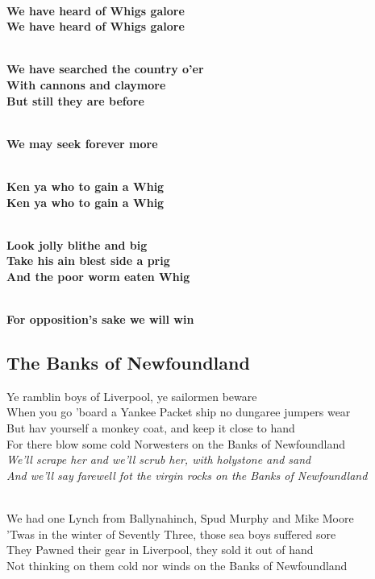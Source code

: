 \documentclass[letterpaper,12pt]{article}
\begin{document}
\begin{multicols}{2}
\noindent
\\\textbf{We have heard of Whigs galore}
\\\textbf{We have heard of Whigs galore}

\noindent
\\\textbf{We have searched the country o'er
\\With cannons and claymore
\\But still they are before}

\noindent
\\\textbf{We may seek forever more}

\noindent
\\\textbf{Ken ya who to gain a Whig}
\\\textbf{Ken ya who to gain a Whig}

\noindent
\\\textbf{Look jolly blithe and big
\\Take his ain blest side a prig
\\And the poor worm eaten Whig}

\noindent
\\\textbf{For opposition's sake we will win}
\end{multicols}
\newpage

\subsection{The Banks of Newfoundland}

\noindent
Ye ramblin boys of Liverpool, ye sailormen beware
\\When you go 'board a Yankee Packet ship no dungaree jumpers wear
\\But hav yourself a monkey coat, and keep it close to hand
\\For there blow some cold Norwesters on the Banks of Newfoundland
\\\textit{We'll scrape her and we'll scrub her, with holystone and sand
\\And we'll say farewell fot the virgin rocks on the Banks of Newfoundland}

\noindent
\\We had one Lynch from Ballynahinch, Spud Murphy and Mike Moore
\\'Twas in the winter of Sevently Three, those sea boys suffered sore
\\They Pawned their gear in Liverpool, they sold it out of hand
\\Not thinking on them cold nor winds on the Banks of Newfoundland
\end{document}
